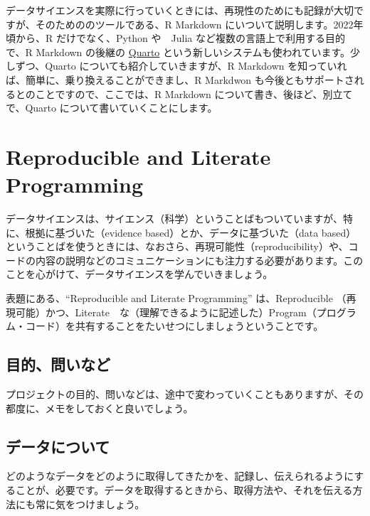 \documentclass[
  xelatex, ja=standard]{bxjsbook}
\theoremstyle{definition}
\theoremstyle{definition}
\theoremstyle{definition}
\theoremstyle{definition}
\theoremstyle{remark}
\begin{document}
データサイエンスを実際に行っていくときには、再現性のためにも記録が大切ですが、そのためののツールである、R Markdown にいついて説明します。2022年頃から、R だけでなく、Python や　Julia など複数の言語上で利用する目的で、R Markdown の後継の \href{https://quarto.org}{Quarto} という新しいシステムも使われています。少しずつ、Quarto についても紹介していきますが、R Markdown を知っていれば、簡単に、乗り換えることができまし、R Markdwon も今後ともサポートされるとのことですので、ここでは、R Markdown について書き、後ほど、別立てで、Quarto について書いていくことにします。

\hypertarget{reproducible-and-literate-programming}{%
\section{Reproducible and Literate Programming}\label{reproducible-and-literate-programming}}

データサイエンスは、サイエンス（科学）ということばもついていますが、特に、根拠に基づいた（evidence based）とか、データに基づいた（data based）ということばを使うときには、なおさら、再現可能性（reproducibility）や、コードの内容の説明などのコミュニケーションにも注力する必要があります。このことを心がけて、データサイエンスを学んでいきましょう。

表題にある、``Reproducible and Literate Programming'' は、Reproducible （再現可能）かつ、Literate　な（理解できるように記述した）Program（プログラム・コード）を共有することをたいせつにしましょうということです。

\hypertarget{ux76eeux7684ux554fux3044ux306aux3069}{%
\subsection{目的、問いなど}\label{ux76eeux7684ux554fux3044ux306aux3069}}

プロジェクトの目的、問いなどは、途中で変わっていくこともありますが、その都度に、メモをしておくと良いでしょう。

\hypertarget{ux30c7ux30fcux30bfux306bux3064ux3044ux3066}{%
\subsection{データについて}\label{ux30c7ux30fcux30bfux306bux3064ux3044ux3066}}

どのようなデータをどのように取得してきたかを、記録し、伝えられるようにすることが、必要です。データを取得するときから、取得方法や、それを伝える方法にも常に気をつけましょう。
\end{document}
